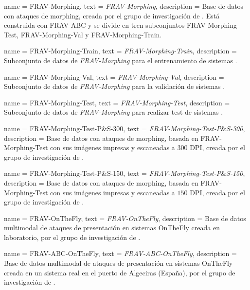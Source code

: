 {
    name        = {FRAV-Morphing},
    text        = {\mbox{\textit{FRAV-Morphing}}},
    description = {Base de datos con ataques de \gls{morphing}, creada por el grupo de investigación  de . Está construida con  \gls{FRAV-ABC} y se divide en tren subconjuntos \gls{FRAV-Morphing-Test}, \gls{FRAV-Morphing-Val} y \gls{FRAV-Morphing-Train}.}
}

{
    name        = {FRAV-Morphing-Train},
    text        = {\mbox{\textit{FRAV-Morphing-Train}}},
    description = {Subconjunto de datos de \textit{\gls{FRAV-Morphing}} para el entrenamiento de sistemas .}
}

{
    name        = {FRAV-Morphing-Val},
    text        = {\mbox{\textit{FRAV-Morphing-Val}}},
    description = {Subconjunto de datos de \textit{\gls{FRAV-Morphing}} para la validación de sistemas .}
}

{
    name        = {FRAV-Morphing-Test},
    text        = {\mbox{\textit{FRAV-Morphing-Test}}},
    description = {Subconjunto de datos de \textit{\gls{FRAV-Morphing}} para realizar test de sistemas .}
}

{
    name        = {FRAV-Morphing-Test-P\&S-300},
    text        = {\mbox{\textit{FRAV-Morphing-Test-P}\&\textit{S-300}}},
    description = {Base de datos con ataques de \gls{morphing}, basada en \gls{FRAV-Morphing-Test} con sus imágenes impresas y escaneadas a $300$ \gls{DPI}, creada por el grupo de investigación  de .}
}

{
    name        = {FRAV-Morphing-Test-P\&S-150},
    text        = {\mbox{\textit{FRAV-Morphing-Test-P}\&\textit{S-150}}},
    description = {Base de datos con ataques de \gls{morphing}, basada en \gls{FRAV-Morphing-Test} con sus imágenes impresas y escaneadas a $150$ \gls{DPI}, creada por el grupo de investigación  de .}
}

{
    name        = {FRAV-OnTheFly},
    text        = {\mbox{\textit{FRAV-OnTheFly}}},
    description = {Base de datos multimodal de ataques de presentación en sistemas  \gls{OnTheFly} creada en laboratorio, por el grupo de investigación  de .}
}

{
    name        = {FRAV-ABC-OnTheFly},
    text        = {\mbox{\textit{FRAV-ABC-OnTheFly}}},
    description = {Base de datos multimodal de ataques de presentación en sistemas  \gls{OnTheFly} creada en un sistema  real en el puerto de Algeciras (España), por el grupo de investigación  de .}
}

